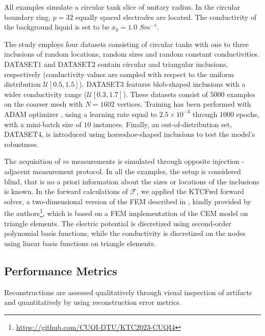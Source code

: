 \documentclass[a4paper,11pt]{article}
\theoremstyle{definition}
\theoremstyle{plain}
\theoremstyle{remark}
\begin{document}
All examples simulate a circular tank slice of
unitary radius. In the circular boundary ring, $p=32$ equally spaced electrodes are located. 
The conductivity of the background liquid is set to be $x_0 = 1.0$ $ S m^{-1}.$


The study employs four datasets consisting of circular tanks with one to three inclusions of random locations, random sizes %
and random constant conductivities. DATASET1 and DATASET2 contain circular and triangular inclusions, respectively (conductivity values are sampled with respect to the uniform distribution $\mathcal{U} [0.5, 1.5]$). DATASET3 features blob-shaped inclusions with a wider conductivity range ($\mathcal{U}[0.3, 1.7]$). These datasets consist of $5000$ examples on the coarser mesh with $N = 1602$ vertices. Training has been performed with ADAM  optimizer \cite{Adam}, using a learning rate equal to $2.5 \times 10^{-3}$ through $1000$ epochs, with a mini-batch size of $10$ instances. Finally, an out-of-distribution set, DATASET4, is introduced using horseshoe-shaped inclusions to test the model's robustness.


The acquisition of $m$ measurements is simulated through opposite injection - adjacent measurement protocol. In all the examples, the setup
is considered blind, that is no a priori information about the sizes or locations of the inclusions is known.
In the forward calculations of $\mathcal{F}$, we applied the KTCFwd forward solver, a two-dimensional version of the FEM described in \cite{Vetal1999}, kindly provided by the authors\footnote{\url{https://github.com/CUQI-DTU/KTC2023-CUQI4}}, which is based on a FEM implementation of the CEM model on triangle elements. The electric potential is discretized using second-order polynomial basis functions, while the conductivity is discretized on the nodes using linear basis functions on triangle elements.








\subsection{Performance Metrics}
\label{sec:fm}

Reconstructions are assessed qualitatively through visual inspection of artifacts and quantitatively by using reconstruction error metrics.
\end{document}
